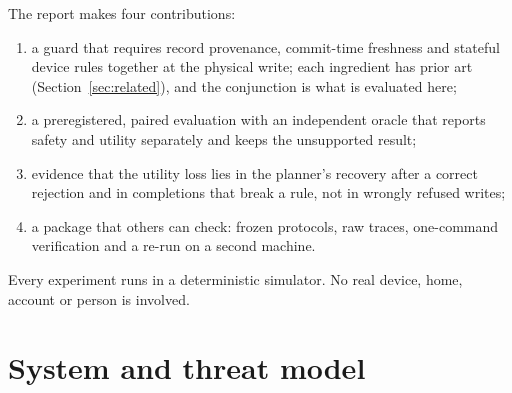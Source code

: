 \documentclass[10pt,twocolumn,a4paper]{article}
\begin{document}
The report makes four contributions:
\begin{enumerate}
\item a guard that requires record provenance, commit-time freshness and stateful device rules together
  at the physical write; each ingredient has prior art (Section~\ref{sec:related}), and the conjunction
  is what is evaluated here;
\item a preregistered, paired evaluation with an independent oracle that reports safety and utility
  separately and keeps the unsupported result;
\item evidence that the utility loss lies in the planner's recovery after a correct rejection and in
  completions that break a rule, not in wrongly refused writes;
\item a package that others can check: frozen protocols, raw traces, one-command verification and a
  re-run on a second machine.
\end{enumerate}
Every experiment runs in a deterministic simulator. No real device, home, account or person is involved.

\section{System and threat model}
\label{sec:system}
\end{document}
